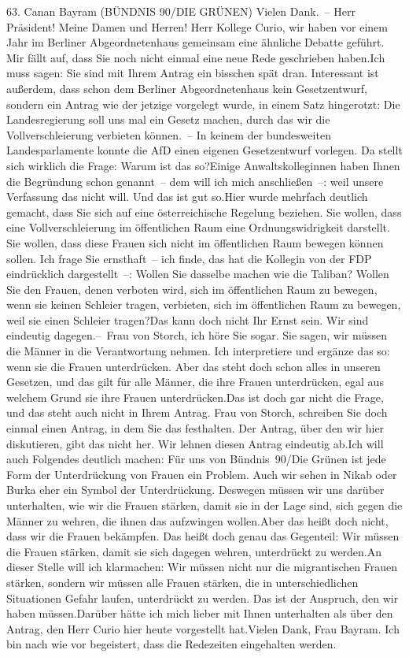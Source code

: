 \documentclass{article}
\begin{document}
	63. Canan Bayram (BÜNDNIS 90/DIE GRÜNEN) Vielen Dank. – Herr Präsident! Meine Damen und Herren! Herr Kollege Curio, wir haben vor einem Jahr im Berliner Abgeordnetenhaus gemeinsam eine ähnliche Debatte geführt. Mir fällt auf, dass Sie noch nicht einmal eine neue Rede geschrieben haben.Ich muss sagen: Sie sind mit Ihrem Antrag ein bisschen spät dran. Interessant ist außerdem, dass schon dem Berliner Abgeordnetenhaus kein Gesetzentwurf, sondern ein Antrag wie der jetzige vorgelegt wurde, in einem Satz hingerotzt: Die Landesregierung soll uns mal ein Gesetz machen, durch das wir die Vollverschleierung verbieten können. – In keinem der bundesweiten Landesparlamente konnte die AfD einen eigenen Gesetzentwurf vorlegen. Da stellt sich wirklich die Frage: Warum ist das so?Einige Anwaltskolleginnen haben Ihnen die Begründung schon genannt – dem will ich mich anschließen –: weil unsere Verfassung das nicht will. Und das ist gut so.Hier wurde mehrfach deutlich gemacht, dass Sie sich auf eine österreichische Regelung beziehen. Sie wollen, dass eine Vollverschleierung im öffentlichen Raum eine Ordnungswidrigkeit darstellt. Sie wollen, dass diese Frauen sich nicht im öffentlichen Raum bewegen können sollen. Ich frage Sie ernsthaft – ich finde, das hat die Kollegin von der FDP eindrücklich dargestellt –: Wollen Sie dasselbe machen wie die Taliban? Wollen Sie den Frauen, denen verboten wird, sich im öffentlichen Raum zu bewegen, wenn sie keinen Schleier tragen, verbieten, sich im öffentlichen Raum zu bewegen, weil sie einen Schleier tragen?Das kann doch nicht Ihr Ernst sein. Wir sind eindeutig dagegen.– Frau von Storch, ich höre Sie sogar. Sie sagen, wir müssen die Männer in die Verantwortung nehmen. Ich interpretiere und ergänze das so: wenn sie die Frauen unterdrücken. Aber das steht doch schon alles in unseren Gesetzen, und das gilt für alle Männer, die ihre Frauen unterdrücken, egal aus welchem Grund sie ihre Frauen unterdrücken.Das ist doch gar nicht die Frage, und das steht auch nicht in Ihrem Antrag. Frau von Storch, schreiben Sie doch einmal einen Antrag, in dem Sie das festhalten. Der Antrag, über den wir hier diskutieren, gibt das nicht her. Wir lehnen diesen Antrag eindeutig ab.Ich will auch Folgendes deutlich machen: Für uns von Bündnis 90/Die Grünen ist jede Form der Unterdrückung von Frauen ein Problem. Auch wir sehen in Nikab oder Burka eher ein Symbol der Unterdrückung. Deswegen müssen wir uns darüber unterhalten, wie wir die Frauen stärken, damit sie in der Lage sind, sich gegen die Männer zu wehren, die ihnen das aufzwingen wollen.Aber das heißt doch nicht, dass wir die Frauen bekämpfen. Das heißt doch genau das Gegenteil: Wir müssen die Frauen stärken, damit sie sich dagegen wehren, unterdrückt zu werden.An dieser Stelle will ich klarmachen: Wir müssen nicht nur die migrantischen Frauen stärken, sondern wir müssen alle Frauen stärken, die in unterschiedlichen Situationen Gefahr laufen, unterdrückt zu werden. Das ist der Anspruch, den wir haben müssen.Darüber hätte ich mich lieber mit Ihnen unterhalten als über den Antrag, den Herr Curio hier heute vorgestellt hat.Vielen Dank, Frau Bayram. Ich bin nach wie vor begeistert, dass die Redezeiten eingehalten werden.
\end{document}
